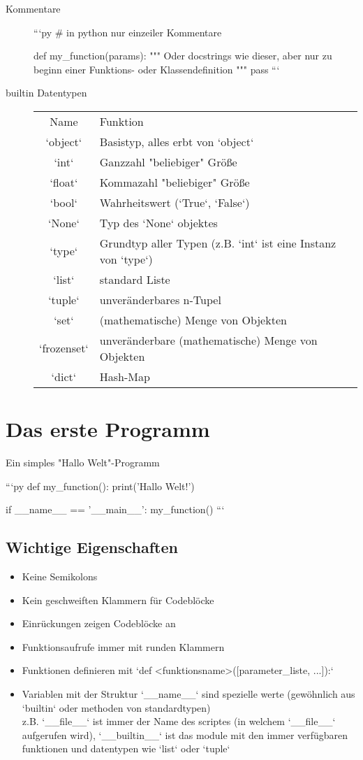\begin{description}
    \item[Kommentare] 
    ```py
    # in python nur einzeiler Kommentare
    
    def my_function(params):
        """
        Oder docstrings wie dieser,
        aber nur zu beginn einer Funktions- oder Klassendefinition
        """
        pass
    ```
    \item[builtin Datentypen]
    \begin{tabular}{c | l}
        Name & Funktion \\
        `object` & Basistyp, alles erbt von `object` \\
        `int` & Ganzzahl "beliebiger" Größe \\
        `float` & Kommazahl "beliebiger" Größe \\
        `bool` & Wahrheitswert (`True`, `False`) \\
        `None` & Typ des `None` objektes \\
        `type` & Grundtyp aller Typen (z.B. `int` ist eine Instanz von `type`) \\
        `list` & standard Liste \\
        `tuple` & unveränderbares n-Tupel \\
        `set` & (mathematische) Menge von Objekten \\
        `frozenset` & unveränderbare (mathematische) Menge von Objekten \\
        `dict` & Hash-Map 
    \end{tabular}
\end{description}


\section{Das erste Programm}
Ein simples "Hallo Welt"-Programm

```py
def my_function():
    print('Hallo Welt!')

if __name__ == '__main__':
    my_function()
```

\subsection{Wichtige Eigenschaften}
\begin{itemize}
    \item Keine Semikolons
    \item Kein geschweiften Klammern für Codeblöcke
    \item Einrückungen zeigen Codeblöcke an
    \item Funktionsaufrufe immer mit runden Klammern
    \item Funktionen definieren mit `def <funktionsname>([parameter_liste, ...]):`
    \item Variablen mit der Struktur `__name__` sind spezielle werte (gewöhnlich aus `builtin` oder methoden von standardtypen)\\
      z.B. `__file__` ist immer der Name des scriptes (in welchem `__file__` aufgerufen wird),  
      `__builtin__` ist das module mit den immer verfügbaren funktionen und datentypen wie `list` oder `tuple`
\end{itemize}



